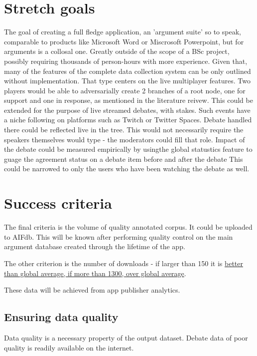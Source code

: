 \documentclass{report}
\begin{document}
\section{Stretch goals}
The goal of creating a full fledge application, an 'argument suite' so to speak, comparable to products like Microsoft Word or Miscrosoft Powerpoint, but for arguments is a collosal one.
Greatly outside of the scope of a BSc project, possibly requiring thousands of person-hours with more experience.
Given that, many of the features of the complete data collection system can be only outlined without implementation.
That type centers on the live multiplayer features. Two players would be able to adversarially create 2 branches of a root node, one for support and one in response, as mentioned in the literature reivew. 
This could be extended for the purpose of live streamed debates, with stakes. Such events have a niche following on platforms such as Twitch or Twitter Spaces.
Debate handled there could be reflected live in the tree. This would not necessarily require the speakers themselves would type - the moderators could fill that role.
Impact of the debate could be measured empirically by usingthe global statustics feature to guage the agreement status on a debate item before and after the debate
This could be narrowed to only the users who have been watching the debate as well.

\section{Success criteria}
The final criteria is the volume of quality annotated corpus. It could be uploaded to AIFdb. 
This will be known after performing quality control on the main argument database created through the lifetime of the app. 

The other criterion is the number of downloads - if larger than 150 it is \href{https://www.statista.com/statistics/1119893/average-number-downloads-united-states-app-publishers/}{ better than global average, if more than 1300, over global average}.


These data will be achieved from app publisher analytics.

\subsection{Ensuring data quality}
Data quality is a necessary property of the output dataset. Debate data of poor quality is readily available on the internet.
\end{document}
